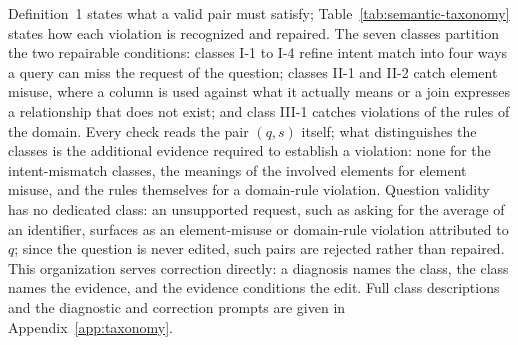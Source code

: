 \documentclass[letterpaper,journal]{IEEEtran}
\begin{document}
Definition~1 states what a valid pair must satisfy; Table~\ref{tab:semantic-taxonomy} states how each violation is recognized and repaired. The seven classes partition the two repairable conditions: classes I-1 to I-4 refine intent match into four ways a query can miss the request of the question; classes II-1 and II-2 catch element misuse, where a column is used against what it actually means or a join expresses a relationship that does not exist; and class III-1 catches violations of the rules of the domain. Every check reads the pair $(q,s)$ itself; what distinguishes the classes is the additional evidence required to establish a violation: none for the intent-mismatch classes, the meanings of the involved elements for element misuse, and the rules themselves for a domain-rule violation. Question validity has no dedicated class: an unsupported request, such as asking for the average of an identifier, surfaces as an element-misuse or domain-rule violation attributed to $q$; since the question is never edited, such pairs are rejected rather than repaired. This organization serves correction directly: a diagnosis names the class, the class names the evidence, and the evidence conditions the edit. Full class descriptions and the diagnostic and correction prompts are given in Appendix~\ref{app:taxonomy}.

\begin{table}[!t]
\centering
\caption{Semantic error taxonomy.}
\label{tab:semantic-taxonomy}
\end{table}
\end{document}
